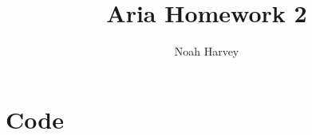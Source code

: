\documentclass{report}
\begin{document}
\title{Aria Homework 2}
\author{Noah Harvey}
\maketitle
\chapter*{Code}

\end{document}
